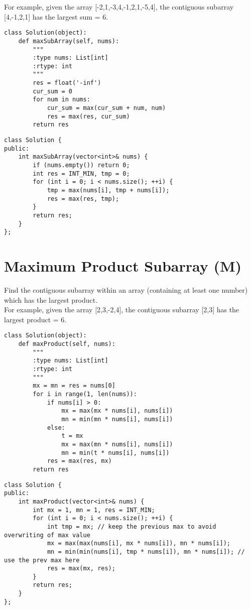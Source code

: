 For example, given the array [-2,1,-3,4,-1,2,1,-5,4], the contiguous subarray [4,-1,2,1] has the largest sum = 6. \\

\begin{lstlisting}
class Solution(object):
    def maxSubArray(self, nums):
        """
        :type nums: List[int]
        :rtype: int
        """
        res = float('-inf')
        cur_sum = 0
        for num in nums:
            cur_sum = max(cur_sum + num, num)
            res = max(res, cur_sum)
        return res
\end{lstlisting}

\begin{lstlisting}
class Solution {
public:
    int maxSubArray(vector<int>& nums) {
        if (nums.empty()) return 0;
        int res = INT_MIN, tmp = 0;
        for (int i = 0; i < nums.size(); ++i) {
            tmp = max(nums[i], tmp + nums[i]);
            res = max(res, tmp);
        }
        return res;
    }
};
\end{lstlisting}


\section{Maximum Product Subarray (M)}
Find the contiguous subarray within an array (containing at least one number) which has the largest product.\\

For example, given the array [2,3,-2,4], the contiguous subarray [2,3] has the largest product = 6. \\

\begin{lstlisting}
class Solution(object):
    def maxProduct(self, nums):
        """
        :type nums: List[int]
        :rtype: int
        """
        mx = mn = res = nums[0]
        for i in range(1, len(nums)):
            if nums[i] > 0:
                mx = max(mx * nums[i], nums[i])
                mn = min(mn * nums[i], nums[i])
            else:
                t = mx
                mx = max(mn * nums[i], nums[i])
                mn = min(t * nums[i], nums[i])
            res = max(res, mx)
        return res
\end{lstlisting}

\begin{lstlisting}
class Solution {
public:
    int maxProduct(vector<int>& nums) {
        int mx = 1, mn = 1, res = INT_MIN;
        for (int i = 0; i < nums.size(); ++i) {
            int tmp = mx; // keep the previous max to avoid overwriting of max value
            mx = max(max(nums[i], mx * nums[i]), mn * nums[i]);
            mn = min(min(nums[i], tmp * nums[i]), mn * nums[i]); // use the prev max here
            res = max(mx, res);
        }
        return res;
    }
};
\end{lstlisting}


